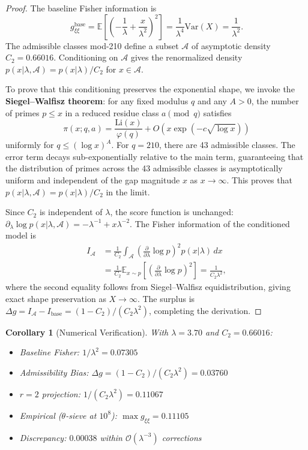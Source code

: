 \documentclass[12pt]{article}
\newtheorem{corollary}[theorem]{Corollary}
\begin{document}
\begin{proof}
The baseline Fisher information is
\[
  g_{\xi\xi}^{\text{base}} = \mathbb{E}\!\left[\left(-\frac{1}{\lambda} + \frac{x}{\lambda^2}\right)^2\right]
  = \frac{1}{\lambda^4}\text{Var}(X) = \frac{1}{\lambda^2}.
\]
The admissible classes mod-210 define a subset $\mathcal{A}$ of asymptotic density
$C_2 = 0.66016$. Conditioning on $\mathcal{A}$ gives the renormalized density
$p(x|\lambda,\mathcal{A}) = p(x|\lambda)/C_2$ for $x \in \mathcal{A}$.

To prove that this conditioning preserves the exponential shape, we invoke the
\textbf{Siegel--Walfisz theorem}: for any fixed modulus $q$ and any $A > 0$, the
number of primes $p \leq x$ in a reduced residue class $a \pmod q$ satisfies
\[
  \pi(x; q, a) = \frac{\text{Li}(x)}{\varphi(q)} + O\!\left(x \exp\left(-c\sqrt{\log x}\right)\right)
\]
uniformly for $q \leq (\log x)^A$. For $q = 210$, there are 43 admissible classes.
The error term decays sub-exponentially relative to the main term, guaranteeing
that the distribution of primes across the 43 admissible classes is asymptotically
uniform and independent of the gap magnitude $x$ as $x \to \infty$. This proves
that $p(x|\lambda,\mathcal{A}) = p(x|\lambda)/C_2$ in the limit.

Since $C_2$ is independent of $\lambda$, the score function is unchanged:
$\partial_\lambda \log p(x|\lambda,\mathcal{A}) = -\lambda^{-1} + x\lambda^{-2}$.
The Fisher information of the conditioned model is
\begin{align*}
  I_{\mathcal{A}} &= \frac{1}{C_2} \int_{\mathcal{A}} \left(\frac{\partial}{\partial\lambda}\log p\right)^2 p(x|\lambda)\,dx \\
  &= \frac{1}{C_2} \mathbb{E}_{x \sim p}\!\left[\left(\frac{\partial}{\partial\lambda}\log p\right)^2\right] = \frac{1}{C_2\lambda^2},
\end{align*}
where the second equality follows from Siegel--Walfisz equidistribution, giving
exact shape preservation as $X \to \infty$. The surplus is
$\Delta g = I_{\mathcal{A}} - I_{\text{base}} = (1-C_2)/(C_2\lambda^2)$,
completing the derivation.
\end{proof}

\begin{corollary}[Numerical Verification]
With $\lambda = 3.70$ and $C_2 = 0.66016$:
\begin{itemize}
  \item Baseline Fisher: $1/\lambda^2 = 0.07305$
  \item Admissibility Bias: $\Delta g = (1-C_2)/(C_2\lambda^2) = 0.03760$
  \item $r=2$ projection: $1/(C_2\lambda^2) = 0.11067$
  \item Empirical ($\theta$-sieve at $10^8$): $\max g_{\xi\xi} = 0.11105$
  \item Discrepancy: $0.00038$ within $\mathcal{O}(\lambda^{-3})$ corrections
\end{itemize}
\end{corollary}
\end{document}
